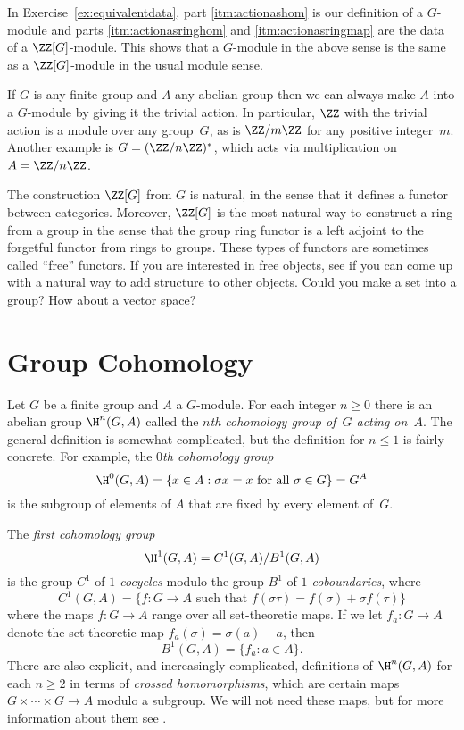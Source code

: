 \begin{remark}
  In Exercise~\ref{ex:equivalentdata}, part \ref{itm:actionashom}
  is our definition
  of a $G$-module and parts \ref{itm:actionasringhom}
  and \ref{itm:actionasringmap} are
  the data of a $\ZZ[G]$-module. This shows that a $G$-module
  in the above sense is the same as a $\ZZ[G]$-module
  in the usual module sense.
\end{remark}

\begin{example}
  If $G$ is any finite group and $A$ any abelian group
  then we can always make $A$ into a $G$-module by
  giving it the trivial action.
  In particular, $\ZZ$ with the trivial action is a
  module over any group~$G$, as is $\ZZ/m\ZZ$ for any positive
  integer~$m$. Another example is $G=(\ZZ/n\ZZ)^*$, which acts
  via multiplication on $A = \ZZ/n\ZZ$.
\end{example}

\begin{remark}
  The construction $\ZZ[G]$ from $G$ is natural, in the
  sense that it defines a functor between categories.
  Moreover, $\ZZ[G]$ is the most natural way to construct
  a ring from a group in the sense that the group ring
  functor is a left adjoint to the forgetful functor from
  rings to groups. These types of functors are sometimes
  called ``free'' functors. If you are interested in
  free objects, see if you can come up with a natural way
  to add structure to other objects. Could you make a set
  into a group? How about a vector space?
\end{remark}

\section{Group Cohomology}

Let $G$ be a finite group and $A$ a $G$-module.
For each integer $n \geq 0$ there is an abelian group $\H^n(G,A)$
called the \emph{$n$th cohomology group of~$G$ acting on~$A$}.  The
general definition is somewhat complicated, but the definition for
$n \leq 1$ is fairly concrete.
For example, the \emph{$0$th cohomology group}
\[
  \H^0(G,A) = \{x \in A : \sigma x = x \text{ for all } \sigma \in G\} = G^A
\]
is the subgroup of elements of $A$ that are fixed by every element
of~$G$.

The \emph{first cohomology group}
\[
  \H^1(G,A) = C^1(G,A)/B^1(G,A)
\]
is the group $C^1$ of \emph{$1$-cocycles} modulo the group $B^1$ of
\emph{$1$-coboundaries}, where
\[
  C^1(G, A) = \{f : G \to A \text{ such that } f(\sigma\tau)
  = f(\sigma) + \sigma f(\tau)\}
\]
where the maps $f: G \to A$ range over all set-theoretic maps.
If we let $f_a: G \to A$ denote the set-theoretic map
$f_a(\sigma) = \sigma(a)-a$,
then
\[
  B^1(G, A) = \{f_a :  a\in A\}.
\]
There are also explicit, and increasingly complicated, definitions of
$\H^n(G,A)$ for each $n \geq 2$ in terms of \emph{crossed homomorphisms},
which are certain maps $G \times \cdots \times G \to A$ modulo a subgroup.
We will not need these maps, but for more information about them
see \cite[Ch.~IV.2]{cassels-frohlich}.

